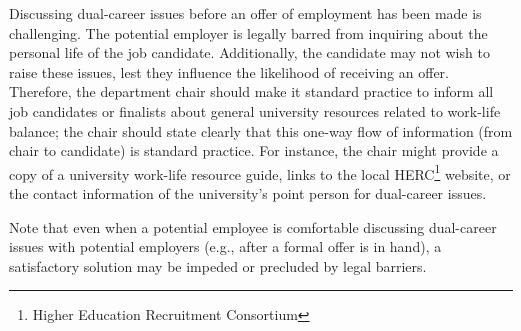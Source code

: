 Discussing dual-career issues before an offer of employment has been made is challenging.  The potential employer is legally barred from inquiring about the personal life of the job candidate. Additionally, the candidate may not wish to raise these issues, lest they influence the likelihood of receiving an offer.  Therefore, the department chair should make it standard practice to inform all job candidates or finalists about general university resources related to work-life balance; the chair should state clearly that this one-way flow of information (from chair to candidate) is standard practice.  For instance, the chair might provide a copy of a university work-life resource guide, links to the local HERC\footnote{Higher Education Recruitment Consortium } website, or the contact information of the university's point person for dual-career issues. 

Note that even when a potential employee is comfortable discussing dual-career issues with potential employers (e.g., after a formal offer is in hand), a satisfactory solution may be impeded or precluded by legal barriers.

















